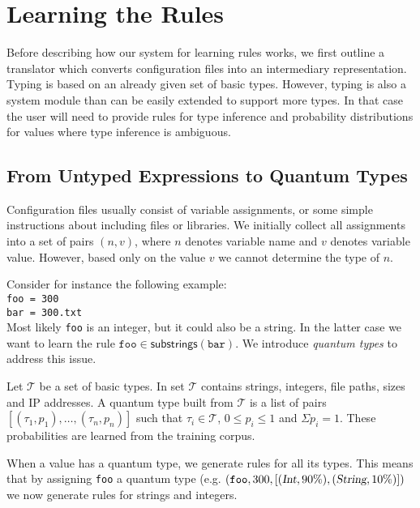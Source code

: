 \section{Learning the Rules}
\label{sec:system}

Before describing how our system for learning rules works, we first outline a translator which converts configuration files into an intermediary representation. Typing is based on an
already given set of basic types. However, typing is also a system module than can be easily extended to support
more types. In that case the user will need to provide rules for type inference and probability distributions for values where type inference is ambiguous.

\subsection{From Untyped Expressions to Quantum Types}

Configuration files usually consist of variable assignments, or some simple instructions about including files or libraries. We initially
collect all assignments into a set of pairs $(n, v)$, where $n$ denotes 
variable name and $v$ denotes variable value. However, based only on the 
value $v$ we cannot determine the type of $n$.

Consider for instance the following example:\\
\texttt{\hspace*{2em}foo = 300\\
\hspace*{2em}bar = 300.txt}\\
Most likely \texttt{foo} is an integer, but it could also be a string.
In the latter case we want to learn the rule $ \texttt{foo} \in \textsf{substrings}(\texttt{bar})$. We introduce {\emph{quantum types}} to 
address this issue.

Let $\mathcal{T}$ be a set of basic types. In \app set $\mathcal{T}$ contains strings, integers, file paths, sizes and IP addresses. 
A quantum type built from $\mathcal{T}$ is a list of pairs $[(\tau_1, p_1),\ldots,(\tau_n, p_n)]$ such that $\tau_i \in \mathcal{T}$, 
$0 \le p_i \le 1$ 
and $\Sigma p_i = 1$. These probabilities are learned from the training 
corpus.

When a value has a quantum type, we generate rules for all its types. This means that by assigning {\texttt{foo}} a quantum type 
(e.g. $(\texttt{foo}, 300, [(\textsl{Int},90\%),(\textsl{String},10\%)])$
we now generate rules for strings and integers.

